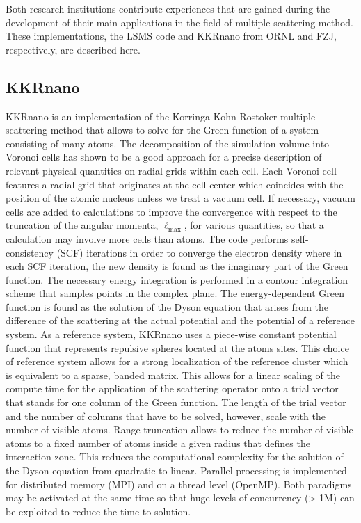 \documentclass{llncs}
\newcommand{\ellmax}{\ell_{\mathrm{max}}}
\def\KKRnano{{KKRnano}}
\def\LSMS{{LSMS}}
\begin{document}
Both research institutions contribute experiences that are gained during the development
of their main applications in the field of multiple scattering method.
These implementations, the \LSMS{} code and \KKRnano{} from ORNL and FZJ, respectively, are described here.

\subsection{KKRnano} \label{section:kkrnano}
\KKRnano{} is an implementation of the Korringa-Kohn-Rostoker multiple scattering method \cite{korringa, kohn-rostoker}
that allows to solve for the Green function of a system consisting of many atoms.
The decomposition of the simulation volume into Voronoi cells has shown to be a good
approach for a precise description of relevant physical quantities on radial grids within each cell.
Each Voronoi cell features a radial grid that originates at the cell center
which coincides with the position of the atomic nucleus unless we treat a vacuum cell.
If necessary, vacuum cells are added to calculations to improve the convergence with respect to the truncation of
the angular momenta, $\ellmax$, for various quantities, so that a calculation may involve more cells than atoms.
The code performs self-consistency (SCF) iterations in order to converge the electron density
where in each SCF iteration, the new density is found as the imaginary part of the Green function.
The necessary energy integration is performed in a contour integration scheme that
samples points in the complex plane.
The energy-dependent Green function is found as the solution of the Dyson equation
that arises from the difference of the scattering at the actual potential and the potential 
of a reference system. As a reference system, \KKRnano{} uses a piece-wise constant potential
function that represents repulsive spheres located at the atoms sites.
This choice of reference system allows for a strong localization of the reference cluster
which is equivalent to a sparse, banded matrix. 
This allows for a linear scaling of the compute time for the application of the scattering operator
onto a trial vector that stands for one column of the Green function. 
The length of the trial vector and the number of columns that have to be solved, however, scale with
the number of visible atoms.
Range truncation allows to reduce the number of visible atoms to a fixed number 
of atoms inside a given radius that defines the interaction zone. This reduces the computational
complexity for the solution of the Dyson equation from quadratic to linear.
Parallel processing is implemented for distributed memory (MPI) and on a thread level (OpenMP).
Both paradigms may be activated at the same time so that huge levels of concurrency 
(> 1M) can be exploited to reduce the time-to-solution.
\end{document}
